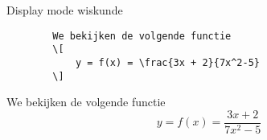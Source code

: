 \begin{frame}[fragile]{Display mode wiskunde}
    
    \begin{verbatim}
        We bekijken de volgende functie
        \[
            y = f(x) = \frac{3x + 2}{7x^2-5}
        \]
    \end{verbatim}
    
\begin{tcolorbox}[width=11cm, size=small]
        We bekijken de volgende functie
        \[
        y = f(x) = \frac{3x + 2}{7x^2-5}
        \]
\end{tcolorbox}
    
\end{frame}